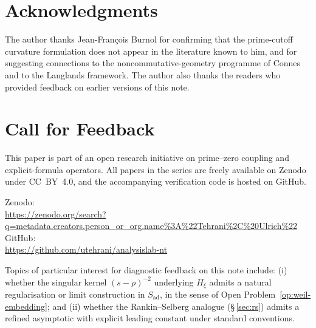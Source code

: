 \documentclass[11pt]{article}
\newcommand{\Hxi}{H_{\xi}}
\newcommand{\Sad}{S_{\mathrm{ad}}}
\begin{document}
\section*{Acknowledgments}

The author thanks Jean-Fran\c{c}ois Burnol for confirming
that the prime-cutoff curvature formulation does not appear
in the literature known to him, and for suggesting connections
to the noncommutative-geometry programme of Connes and to the
Langlands framework.
The author also thanks the readers who provided feedback on
earlier versions of this note.

\section*{Call for Feedback}

This paper is part of an open research initiative on prime--zero
coupling and explicit-formula operators.
All papers in the series are freely available on Zenodo under
CC~BY~4.0, and the accompanying verification code is hosted
on GitHub.

{\raggedright
Zenodo:\\
\url{https://zenodo.org/search?q=metadata.creators.person_or_org.name\%3A\%22Tehrani\%2C\%20Ulrich\%22}\\
GitHub:\\
\url{https://github.com/utehrani/analysislab-nt}
\par}

Topics of particular interest for diagnostic feedback on this
note include:
(i) whether the singular kernel $(s-\rho)^{-2}$ underlying
$\Hxi$ admits a natural regularisation or limit construction
in $\Sad$, in the sense of
Open Problem~\ref{op:weil-embedding}; and
(ii) whether the Rankin--Selberg analogue
(\S\,\ref{sec:rs}) admits a refined asymptotic with explicit
leading constant under standard conventions.
\end{document}

